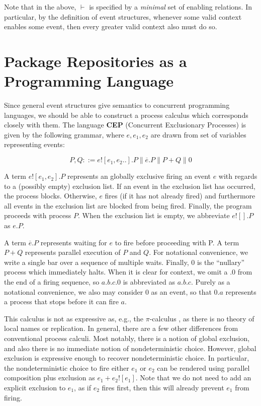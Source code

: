 \documentclass[hoptionsi,review,screen,format=sigconf]{acmart}
\theoremstyle{definition}
\newcommand{\bor}{\mathop{\|}}
\begin{document}
Note that in the above, \(\vdash\) is specified by a \textit{minimal} set of enabling relations. In particular, by the definition of event structures, whenever some valid context enables some event, then every greater valid context also must do so.

\section{Package Repositories as a Programming Language}


Since general event structures give semantics to concurrent programming languages, we should be able to construct a process calculus which corresponds closely with them. The language \textbf{CEP} (Concurrent Exclusionary Processes) is given by the following grammar, where \(e, e_1, e_2\) are drawn from set of variables representing events:

\begin{equation*}
P,Q ::= e![e_1,e_2..].P \bor \overline{e}.P  \bor P + Q \bor 0
\end{equation*}

A term \(e![e_1,e_2].P\) represents an globally exclusive firing an event \(e\) with regards to a (possibly empty) exclusion list. If an event in the exclusion list has occurred, the process blocks. Otherwise, \(e\) fires (if it has not already fired) and furthermore all events in the exclusion list are blocked from being fired. Finally, the program proceeds with process \(P\). When the exclusion list is empty, we abbreviate \(e![].P\) as \(e.P\).

A term \(\overline{e}.P\) represents waiting for \(e\) to fire before proceeding with P. A term \(P + Q\) represents parallel execution of \(P\) and \(Q\). For notational convenience, we write a single bar over a sequence of multiple waits. Finally, \(0\) is the ``nullary'' process which immediately halts. When it is clear for context, we omit a \(.0\) from the end of a firing sequence, so \(a.b.c.0\) is abbreviated as \(a.b.c\). Purely as a notational convenience, we also may consider 0 as an event, so that \(0.a\) represents a process that stops before it can fire \(a\).

This calculus is not as expressive as, e.g., the \(\pi\)-calculus \cite{milner1992calculus}, as there is no theory of local names or replication. In general, there are a few other differences from conventional process calculi. Most notably, there is a notion of global exclusion, and also there is no immediate notion of nondeterministic choice. However, global exclusion is expressive enough to recover nondeterministic choice. In particular, the nondeterministic choice to fire either \(e_1\) or \(e_2\) can be rendered using parallel composition plus exclusion as \(e_1 + e_2![e_1]\). Note that we do not need to add an explicit exclusion to \(e_1\), as if \(e_2\) fires first, then this will already prevent \(e_1\) from firing.
\end{document}
